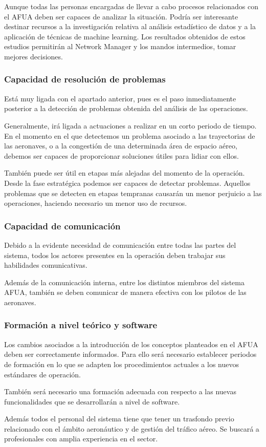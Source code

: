 Aunque todas las personas encargadas de llevar a cabo procesos relacionados con el AFUA deben ser capaces de analizar la situación. Podría ser interesante destinar recursos a la investigación relativa al análisis estadístico de datos y a la aplicación de técnicas de machine learning. Los resultados obtenidos de estos estudios permitirán al Network Manager y los mandos intermedios, tomar mejores decisiones.

\subsubsection{Capacidad de resolución de problemas}

Está muy ligada con el apartado anterior, pues es el paso inmediatamente posterior a la detección de problemas obtenida del análisis de las operaciones.

Generalmente, irá ligada a actuaciones a realizar en un corto periodo de tiempo. En el momento en el que detectemos un problema asociado a las trayectorias de las aeronaves, o a la congestión de una determinada área de espacio aéreo, debemos ser capaces de proporcionar soluciones útiles para lidiar con ellos.

También puede ser útil en etapas más alejadas del momento de la operación. Desde la fase estratégica podemos ser capaces de detectar problemas. Aquellos problemas que se detecten en etapas tempranas causarán un menor perjuicio a las operaciones, haciendo necesario un menor uso de recursos.

\subsubsection{Capacidad de comunicación}

Debido a la evidente necesidad de comunicación entre todas las partes del sistema, todos los actores presentes en la operación deben trabajar sus habilidades comunicativas. 

Además de la comunicación interna, entre los distintos miembros del sistema AFUA, también se deben comunicar de manera efectiva con los pilotos de las aeronaves.

\subsubsection{Formación a nivel teórico y software}

Los cambios asociados a la introducción de los conceptos planteados en el AFUA deben ser correctamente informados. Para ello será necesario establecer periodos de formación en lo que se adapten los procedimientos actuales a los nuevos estándares de operación.

También será necesario una formación adecuada con respecto a las nuevas funcionalidades que se desarrollarán a nivel de software.

Además todos el personal del sistema tiene que tener un trasfondo previo relacionado con el ámbito aeronáutico y de gestión del tráfico aéreo. Se buscará a profesionales con amplia experiencia en el sector.